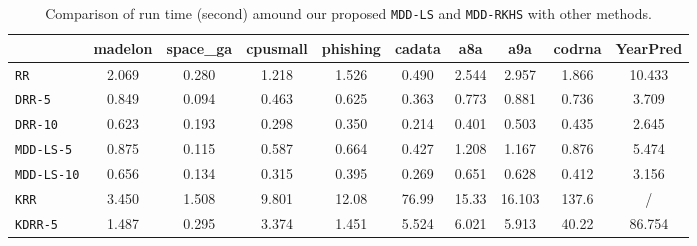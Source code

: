 \documentclass{article}
\begin{document}
\begin{table*}[t]
\small
\footnotesize
   \caption{
    \small Comparison of run time (second) amound our proposed \texttt{MDD-LS} and \texttt{MDD-RKHS} with other methods.
   }
   \label{tabel:time}
    \begin{tabular*}{\linewidth}{@{\extracolsep{-0.10cm}}lccccccccc}
    \toprule
                                &madelon                  &space\_ga               &cpusmall            &phishing           &cadata             &a8a                  &a9a                    &cod\-rna                   &YearPred                \\   \hline
\texttt{RR}                              &2.069                    &0.280                   &1.218               &1.526              &0.490              &2.544                &2.957                  &1.866                      &10.433 \\
\texttt{DRR-5}                           &0.849                    &0.094                   &0.463               &0.625              &0.363              &0.773                &0.881                  &0.736                      &3.709 \\
\texttt{DRR-10}                          &0.623                    &0.193                   &0.298               &0.350              &0.214              &0.401                &0.503                  &0.435                      &2.645 \\
\texttt{MDD-LS-5}                        &0.875                    &0.115                   &0.587               &0.664              &0.427              &1.208                &1.167                  &0.876                      &5.474 \\
\texttt{MDD-LS-10}                       &0.656                    &0.134                   &0.315               &0.395              &0.269              &0.651                &0.628                  &0.412                      &3.156 \\
\hline \hline
\texttt{KRR}                             &3.450                    &1.508                   &9.801               &12.08              &76.99              &15.33                &16.103                 &137.6                      &/ \\
\texttt{KDRR-5}                          &1.487                    &0.295                   &3.374               &1.451              &5.524              &6.021                &5.913                  &40.22                      &86.754\\

\end{tabular*}
\end{table*}
\end{document}

